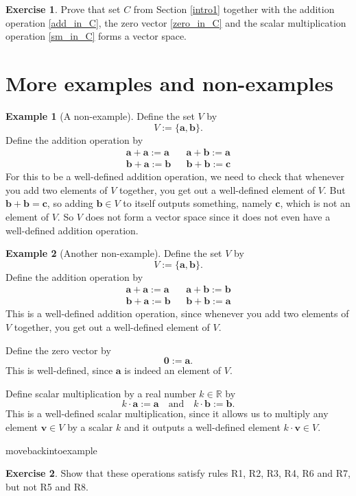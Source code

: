 \documentclass[a4paper,11pt]{book}
\theoremstyle{definition}
\newtheorem{exercise}{Exercise}
\newtheorem{example_environment}{Example}[chapter]
\newcommand{\be}{\begin{equation}}
\newcommand{\ee}{\end{equation}}
\newcommand{\ve}[1]{\mathbf{#1}}
\newenvironment{example}
	{
		\begin{oframed} 
		\begin{example_environment}
	}
	{
		\end{example_environment}
		\end{oframed}
	}
\begin{document}
\begin{exercise} Prove that set $C$ from Section \ref{intro1} together with the addition operation \eqref{add_in_C}, the zero vector \eqref{zero_in_C} and the scalar multiplication operation \eqref{sm_in_C} forms a vector space.
\end{exercise}




\section{More examples and non-examples} \label{Ch1Sec4MoreExamples}

\begin{example}[A non-example] Define the set $V$ by 
\be
 V := \{ \mathbf{a}, \mathbf{b} \} .
\ee
Define the addition operation by 
\begin{align}
 \ve{a} + \ve{a} := \ve{a} && \ve{a} + \ve{b} := \ve{a} \\
 \ve{b} + \ve{a} := \ve{b} && \ve{b} + \ve{b} := \ve{c} 
\end{align}
For this to be a well-defined addition operation, we need to check that whenever you add two elements of $V$ together, you get out a well-defined element of $V$. But $\ve{b} + \ve{b} = \ve{c}$, so adding $\ve{b} \in V$ to itself outputs something, namely $\ve{c}$, which is not an element of $V$. So $V$ does not form a vector space since it does not even have a well-defined addition operation.
\end{example}

\begin{example}[Another non-example] Define the set $V$ by 
\be
 V := \{ \mathbf{a}, \mathbf{b} \} .
\ee
Define the addition operation by 
\begin{align}
 \ve{a} + \ve{a} := \ve{a} && \ve{a} + \ve{b} := \ve{b} \label{ne_11} \\
 \ve{b} + \ve{a} := \ve{b} && \ve{b} + \ve{b} := \ve{a} \label{ne_12}
\end{align}
This is a well-defined addition operation, since whenever you add two elements of $V$ together, you get out a well-defined element of $V$.

Define the zero vector by 
\be
 \ve{0} := \ve{a}. \label{ne_13}
\ee
This is well-defined, since $\ve{a}$ is indeed an element of $V$.

Define scalar multiplication by a real number $k \in \mathbb{R}$ by
\be
 k \cdot \ve{a} := \ve{a} \quad \mbox{and} \quad k \cdot \ve{b} := \ve{b}. \label{ne_14}
\ee
This is a well-defined scalar multiplication, since it allows us to multiply any element $\ve{v} \in V$ by a scalar $k$ and it outputs a well-defined element $k \cdot \ve{v} \in V$. 

\end{example}
movebackintoexample
\begin{exercise} Show that these operations satisfy rules R1, R2, R3, R4, R6 and R7, but not R5 and R8.
\end{exercise}
\end{document}
